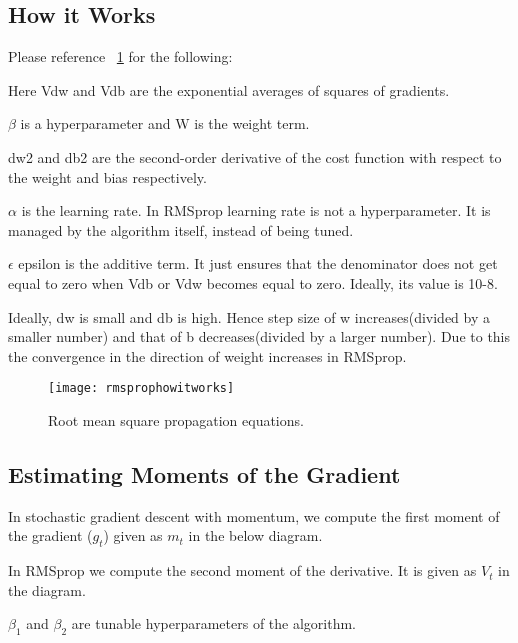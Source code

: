 	\subsection{How it Works}
Please reference \figurename~\ref{fig:rmsprophowitworks} for the following:
	\begin{bulletedlist}
		\item Here Vdw and Vdb are the exponential averages of squares of gradients.
		\item $\beta$ is a hyperparameter and W is the weight term.
		\item dw2 and db2 are the second-order derivative of the cost function with respect to the weight and bias respectively.
		\item $\alpha$ is the learning rate. In RMSprop learning rate is not a hyperparameter.  It is managed by the algorithm itself, instead of being tuned.
		\item $\epsilon$ epsilon is the additive term.  It just ensures that the denominator does not get equal to zero when Vdb or Vdw becomes equal to zero.  Ideally, its value is 10-8.
		\item Ideally, dw is small and db is high. Hence step size of w increases(divided by a smaller number) and that of b decreases(divided by a larger number).  Due to this the convergence in the direction of weight increases in RMSprop.
	\end{bulletedlist}
 	\begin{figure}[h]
		\centering
		\texttt{[image: rmsprophowitworks]}
		\caption[Root mean square propagation equations]{Root mean square propagation equations.}
		\label{fig:rmsprophowitworks}
	\end{figure}

	\subsection{Estimating Moments of the Gradient}

	\begin{bulletedlist}
		\item In stochastic gradient descent with momentum, we compute the first moment of the gradient ($g_t$) given as $m_t$ in the below diagram.
		\item In RMSprop we compute the second moment of the derivative. It is given as $V_t$ in the diagram.
		\item $\beta_1$ and $\beta_2$ are tunable hyperparameters of the algorithm.
	\end{bulletedlist}


